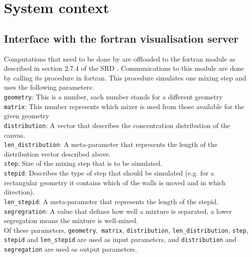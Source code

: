 \chapter{System context}
\label{chap:systcontext}
  
\section{Interface with the fortran visualisation server}
Computations that need to be done by \applicationname are offloaded to the fortran module as described in section 2.7.4 of the SRD \cite{srd}. Communications to this module are done by calling its procedure in fortran. This procedure simulates one mixing step and uses the following parameters:\\
\texttt{geometry}: This is a number, each number stands for a different geometry \\
\texttt{matrix}: This number represents which mixer is used from those available for the given geometry \\
\texttt{distribution}: A vector that describes the concentration distribution of the canvas.\\
\texttt{len\_distribution}: A meta-parameter that represents the length of the distribution vector described above.\\
\texttt{step}: Size of the mixing step that is to be simulated.\\
\texttt{stepid}: Describes the type of step that should be simulated (e.g. for a rectangular geometry it contains which of the walls is moved and in which direction). \\
\texttt{len\_stepid}: A meta-parameter that represents the length of the stepid.\\
\texttt{segregration}: A value that defines how well a mixture is separated, a lower segregation means the mixture is well-mixed.\\
Of these parameters, \texttt{geometry},\texttt{ matrix}, \texttt{distribution}, \texttt{len\_distribution}, \texttt{step}, \texttt{stepid} and \texttt{len\_stepid} are used as input parameters, and \texttt{distribution} and \texttt{segregation} are used as output parameters.



